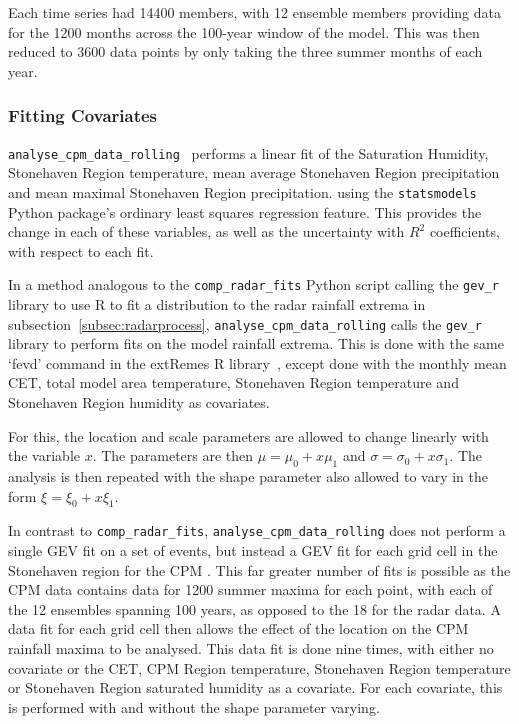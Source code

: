 Each time series had 14400 members,
    with 12 ensemble members providing data for the 1200 months across the 100-year window of the model.
This was then reduced to 3600 data points by only taking the three summer months of each year.

\subsubsection{Fitting Covariates}

\texttt{analyse\_cpm\_data\_rolling}~\cite{Me_Code} performs a linear fit of the Saturation Humidity,
    Stonehaven Region temperature, mean average Stonehaven Region precipitation and mean maximal Stonehaven Region precipitation.
    using the \texttt{statsmodels} Python package's ordinary least squares regression feature.
This provides the change in each of these variables, as well as the uncertainty with $R^2$ coefficients,
    with respect to each fit.

In a method analogous to the \texttt{comp\_radar\_fits} Python script calling the \texttt{gev\_r} library to use R to fit
    a distribution to the radar rainfall extrema in subsection~\ref{subsec:radarprocess},
    \texttt{analyse\_cpm\_data\_rolling} calls the \texttt{gev\_r} library to perform fits on the model rainfall extrema.
This is done with the same `fevd' command in the extRemes R library~\cite{extremes_R},
    except done with the monthly mean CET, total model area temperature, Stonehaven Region temperature and Stonehaven Region humidity as covariates.

For this,
    the location and scale parameters are allowed to change linearly with the variable $x$.
The parameters are then $\mu = \mu_0 + x\mu_1$ and $\sigma = \sigma_0 + x\sigma_1$.
The analysis is then repeated with the shape parameter also allowed to vary in the form $\xi = \xi_0 + x\xi_1$.

In contrast to \texttt{comp\_radar\_fits},
    \texttt{analyse\_cpm\_data\_rolling} does not perform a single GEV fit on a set of events,
    but instead a GEV fit for each grid cell in the Stonehaven region for the CPM .
This far greater number of fits is possible as the CPM data contains data for 1200 summer maxima for each point,
    with each of the 12 ensembles spanning 100 years,
    as opposed to the 18 for the radar data.
A data fit for each grid cell then allows the effect of the location on the CPM rainfall maxima to be analysed.
This data fit is done nine times,
    with either no covariate or the CET, CPM Region temperature, Stonehaven Region temperature or Stonehaven Region saturated humidity as a covariate.
For each covariate, this is performed with and without the shape parameter varying.

